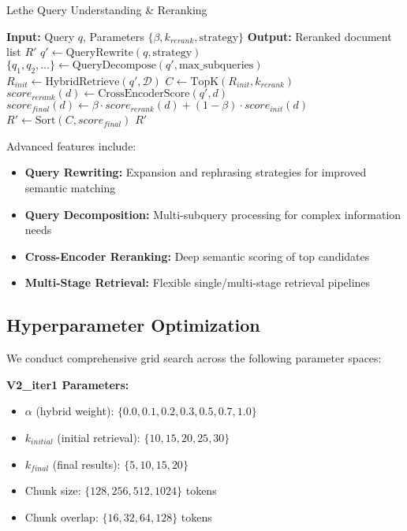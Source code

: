 \documentclass{neurips_2025}
\begin{document}
\begin{algorithm}
\caption{Lethe Query Understanding \& Reranking}
\begin{algorithmic}[1]
\STATE \textbf{Input:} Query $q$, Parameters $\{\beta, k_{rerank}, \text{strategy}\}$
\STATE \textbf{Output:} Reranked document list $R'$
\STATE $q' \leftarrow \text{QueryRewrite}(q, \text{strategy})$
\STATE $\{q_1, q_2, \ldots\} \leftarrow \text{QueryDecompose}(q', \text{max\_subqueries})$
\STATE $R_{init} \leftarrow \text{HybridRetrieve}(q', \mathcal{D})$
\STATE $C \leftarrow \text{TopK}(R_{init}, k_{rerank})$
    \STATE $score_{rerank}(d) \leftarrow \text{CrossEncoderScore}(q', d)$
    \STATE $score_{final}(d) \leftarrow \beta \cdot score_{rerank}(d) + (1-\beta) \cdot score_{init}(d)$
\ENDFOR
\STATE $R' \leftarrow \text{Sort}(C, score_{final})$
\RETURN $R'$
\end{algorithmic}
\end{algorithm}

Advanced features include:
\begin{itemize}
\item \textbf{Query Rewriting:} Expansion and rephrasing strategies for improved semantic matching
\item \textbf{Query Decomposition:} Multi-subquery processing for complex information needs  
\item \textbf{Cross-Encoder Reranking:} Deep semantic scoring of top candidates
\item \textbf{Multi-Stage Retrieval:} Flexible single/multi-stage retrieval pipelines
\end{itemize}

\subsection{Hyperparameter Optimization}

We conduct comprehensive grid search across the following parameter spaces:

\textbf{V2\_iter1 Parameters:}
\begin{itemize}
\item $\alpha$ (hybrid weight): $\{0.0, 0.1, 0.2, 0.3, 0.5, 0.7, 1.0\}$
\item $k_{initial}$ (initial retrieval): $\{10, 15, 20, 25, 30\}$
\item $k_{final}$ (final results): $\{5, 10, 15, 20\}$
\item Chunk size: $\{128, 256, 512, 1024\}$ tokens
\item Chunk overlap: $\{16, 32, 64, 128\}$ tokens
\end{itemize}
\end{document}
